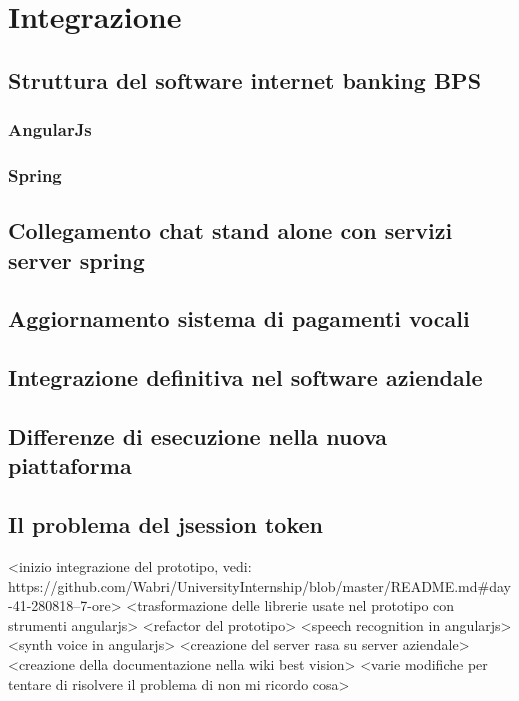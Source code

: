 \chapter{Integrazione}

\section{Struttura del software internet banking BPS}

\subsection{AngularJs}

\subsection{Spring}

\section{Collegamento chat stand alone con servizi server spring}

\section{Aggiornamento sistema di pagamenti vocali}

\section{Integrazione definitiva nel software aziendale}

\section{Differenze di esecuzione nella nuova piattaforma}

\section{Il problema del jsession token}

<inizio integrazione del prototipo, vedi: https://github.com/Wabri/UniversityInternship/blob/master/README.md#day-41-280818--7-ore>
<trasformazione delle librerie usate nel prototipo con strumenti angularjs>
<refactor del prototipo>
<speech recognition in angularjs>
<synth voice in angularjs>
<creazione del server rasa su server aziendale>
<creazione della documentazione nella wiki best vision>
<varie modifiche per tentare di risolvere il problema di non mi ricordo cosa>
